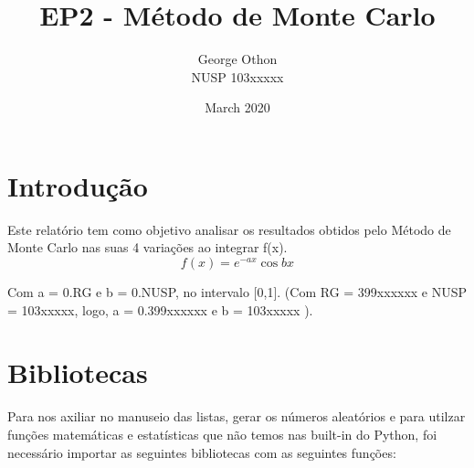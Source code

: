 \documentclass{article}
\title{EP2 - Método de Monte Carlo}
\author{George Othon\\NUSP 103xxxxx}
\date{March 2020}
\begin{document}
\maketitle

\section{Introdução}

\par
Este relatório tem como objetivo analisar os resultados obtidos pelo Método de Monte Carlo nas suas 4 variações ao integrar f(x).
\[
f(x) = e ^ {-ax} \cos{bx}
\]

Com a = 0.RG e b = 0.NUSP, no intervalo [0,1]. (Com RG = 399xxxxxx e NUSP = 103xxxxx, logo, a  = 0.399xxxxxx e b = 103xxxxx ).\\

\section{Bibliotecas}
Para nos axiliar no manuseio das listas, gerar os números aleatórios e para utilzar funções matemáticas e estatísticas que não temos nas built-in do Python, foi necessário importar as seguintes bibliotecas com as seguintes funções:
\end{document}

